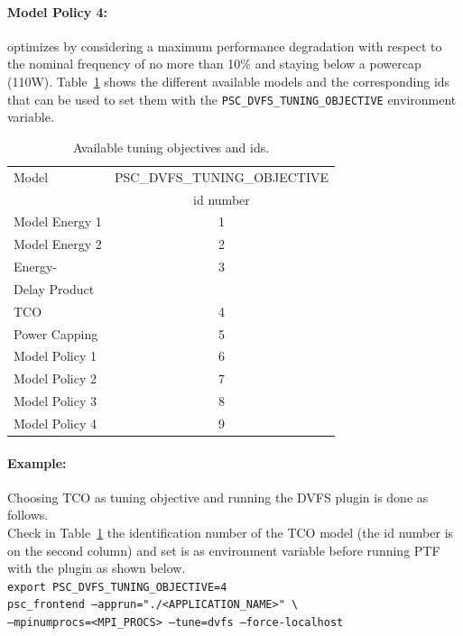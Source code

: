 \documentclass[11pt,a4paper, oneside]{book} %
\begin{document}
  \paragraph{Model Policy 4:} optimizes by considering a maximum performance degradation with respect to the nominal frequency of no more than 10\% and staying below a powercap (110W).
  Table~\ref{table:models} shows the different available models and the corresponding ids that can be used to set them with the \texttt{PSC\_DVFS\_TUNING\_OBJECTIVE} environment variable.
\begin{table}[htpb]
\centering
\begin{tabular}{lc}
\hline
Model & PSC\_DVFS\_TUNING\_OBJECTIVE \\
      & id number \\\hline
Model Energy 1 & 1\\
Model Energy 2 & 2\\
Energy-  & 3\\
Delay Product & \\
TCO     & 4\\
Power Capping  & 5\\
Model Policy 1 & 6\\
Model Policy 2 & 7\\
Model Policy 3 & 8\\
Model Policy 4 & 9\\\hline
\end{tabular}
	\caption{Available tuning objectives and ids.}
	\label{table:models}
\end{table}

  \paragraph{Example:} Choosing TCO as tuning objective and running the DVFS plugin is done as follows. \\
  Check in Table~\ref{table:models} the identification number of the TCO model (the id number is on the second column) and set is as environment variable before running PTF with the plugin as shown below. \\

  \texttt{export PSC\_DVFS\_TUNING\_OBJECTIVE=4} \\
  \texttt{psc\_frontend --apprun="./<APPLICATION\_NAME>" \textbackslash \\ --mpinumprocs=<MPI\_PROCS> --tune=dvfs --force-localhost}
\end{document}
